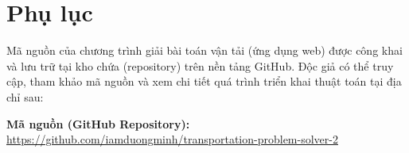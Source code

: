\documentclass[../main]{subfiles}
\begin{document}
	\chapter*{Phụ lục}
	
	Mã nguồn của chương trình giải bài toán vận tải (ứng dụng web) được công khai và lưu trữ tại kho chứa (repository) trên nền tảng GitHub. Độc giả có thể truy cập, tham khảo mã nguồn và xem chi tiết quá trình triển khai thuật toán tại địa chỉ sau:
	
	\vspace{0.5cm}
	\noindent\textbf{Mã nguồn (GitHub Repository):} \\
	\url{https://github.com/iamduongminh/transportation-problem-solver-2}
\end{document}
